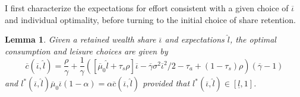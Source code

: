 \documentclass[11pt]{article}
\theoremstyle{plain}
\newtheorem{lemma}[thm]{Lemma}
\begin{document}
I first characterize the expectations for effort consistent with a given choice of $\overline{\iota}$ and individual optimality, before turning to the initial choice of share retention. 

\begin{lemma} \label{FIXiotal}
Given a retained wealth share $\overline{\iota}$ and expectations $\hat{l}$, the optimal consumption and leisure choices are given by
$$
\overline{c}(\overline{\iota}, \hat{l}) = \frac{\rho}{\gamma} + \frac{1}{\gamma}{\left([\overline{\mu}_0\hat{l} + \tau_s\rho]\overline{\iota} - \overline{\gamma}\sigma^2\overline{\iota}^2/2 - \tau_a + (1-\tau_s)\rho\right)}(\overline{\gamma} - 1) 
$$
and $l^*(\overline{\iota}, \hat{l})\overline{\mu}_0\overline{\iota}(1-\alpha) = \alpha \overline{c}(\overline{\iota}, \hat{l})$
provided that $l^*(\overline{\iota}, \hat{l}) \in [\underline{l}, 1]$. 
\end{lemma}
\end{document}
